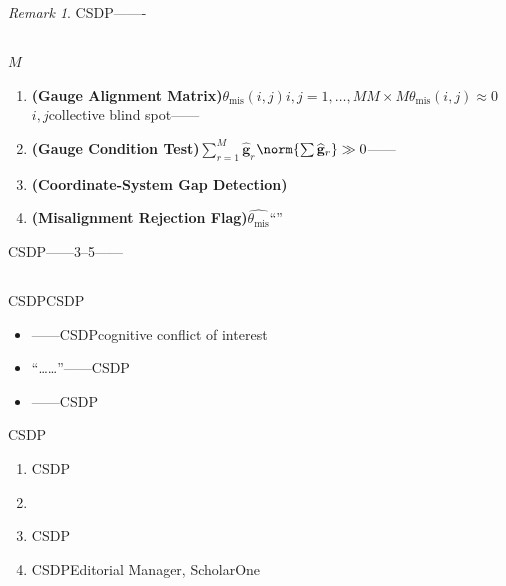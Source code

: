 \documentclass[12pt,a4paper]{article}
\theoremstyle{remark}
\newtheorem{remark}[theorem]{Remark}
\newcommand{\gaugeVec}{\mathbf{g}}
\newcommand{\misalignAngle}{\theta_{\text{mis}}}
\begin{document}
\begin{remark}
CSDP——\textbf{}-
\end{remark}

\subsection{}

$M$

\begin{enumerate}[label=(\arabic*)]
    \item \textbf{ (Gauge Alignment Matrix)}$\misalignAngle(i, j)$$i, j = 1, \dots, M$$M \times M$$\misalignAngle(i, j) \approx 0$$i,j$\textbf{}collective blind spot——
    
    \item \textbf{ (Gauge Condition Test)}$\sum_{r=1}^{M} \widehat{\gaugeVec}_r$$\norm{\sum \widehat{\gaugeVec}_r} \gg 0$——
    
    \item \textbf{ (Coordinate-System Gap Detection)}\textbf{}\textbf{}
    
    \item \textbf{ (Misalignment Rejection Flag)}$\widehat{\misalignAngle}$``''\textbf{}
\end{enumerate}

\begin{honestcrit}{CSDP——3--5\textit{}——}
\end{honestcrit}

\subsection{}

CSDPCSDP

\begin{itemize}
    \item ——CSDP\textit{}cognitive conflict of interest
    \item ``……''——CSDP
    \item ——CSDP
\end{itemize}

CSDP
\begin{enumerate}[label= \arabic*:, leftmargin=*]
    \item \textbf{}CSDP
    \item \textbf{}
    \item \textbf{}CSDP
    \item \textbf{}CSDPEditorial Manager, ScholarOne
\end{enumerate}
\end{document}
